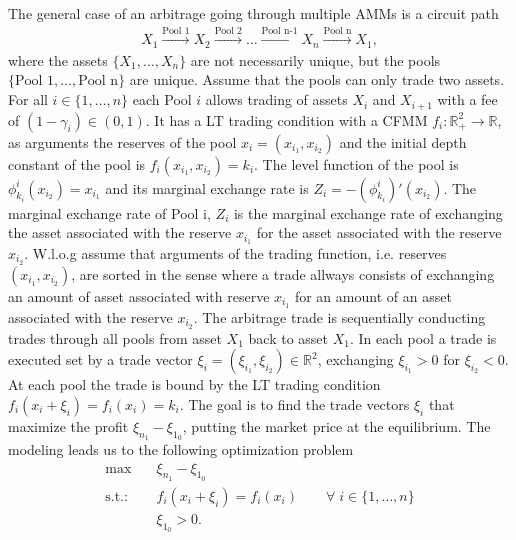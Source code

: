 The general case of an arbitrage going through multiple AMMs is a circuit path
\begin{align}
    X_1 \xrightarrow{\text{Pool 1}} X_2 \xrightarrow{\text{Pool 2}}
    \hdots \xrightarrow{\text{Pool n-1}} X_n \xrightarrow{\text{Pool n}} X_1,
    \label{eq: path}
\end{align}
where the assets $\{X_1, \ldots, X_n\}$ are not necessarily unique, but the
pools $\{\text{Pool 1},\ldots,\text{Pool n}\}$ are unique. Assume that the
pools can only trade two assets. For all $i \in \{1,\ldots,n\}$ each Pool $i$
allows trading of assets $X_i$ and $X_{i+1}$ with a fee of $(1-\gamma_i) \in
(0,1)$. It has a LT trading condition with a CFMM $f_i:\mathbb{R}_+^{2}\to
\mathbb{R}$, as arguments the reserves of the pool $x_i = (x_{i_1}, x_{i_2})$ and
the initial depth constant of the pool is $f_i(x_{i_1}, x_{i_2}) = k_i$. The
level function of the pool is $\phi^{i}_{k_i}(x_{i_2}) = x_{i_1}$ and its
marginal exchange rate is $Z_i = -(\phi^{i}_{k_i})'(x_{i_2})$. The marginal
exchange rate of Pool i, $Z_i$ is the marginal exchange rate of exchanging
the asset associated with the reserve $x_{i_1}$ for the asset associated with
the reserve $x_{i_2}$. W.l.o.g assume that arguments of the trading function,
i.e. reserves $(x_{i_1}, x_{i_2})$, are sorted in the sense where a trade
allways consists of exchanging an amount of asset associated with reserve $x_{i_1}$ for
an amount of an asset associated with the reserve $x_{i_2}$.
The arbitrage trade is sequentially conducting trades through all pools from
asset $X_1$ back to asset $X_1$. In each pool a trade is executed set by a
trade vector $\xi_i = (\xi_{i_1}, \xi_{i_2}) \in \mathbb{R}^{2}$, exchanging $\xi_{i_1}>0$ for
$\xi_{i_2}<0$. At each pool the trade is bound by the LT trading condition
$f_i(x_i+\xi_i) = f_i(x_i) = k_i$. The goal is to find the trade vectors
$\xi_i$ that maximize the profit $\xi_{n_1} - \xi_{1_0}$, putting the market
price at the equilibrium. The modeling leads us to the following optimization
problem
\begin{align}
    \max \quad &\xi_{n_1} - \xi_{1_0} \\
    \text{s.t.:}\quad &f_i(x_i+\xi_i) = f_i(x_i) \quad \quad \forall\;
    i \in \{1,\ldots,n\}\\
             &\xi_{1_0} > 0.
\end{align}
